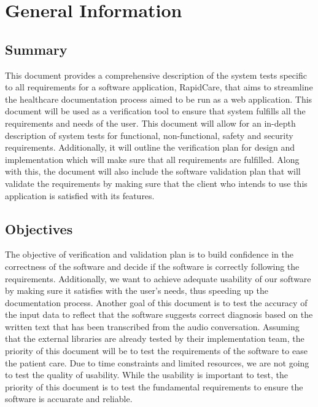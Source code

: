 \documentclass[12pt, titlepage]{article}
\begin{document}

\newpage


\section{General Information}

\subsection{Summary}

This document provides a comprehensive description of the system tests specific to all requirements for a software application, RapidCare, that aims to streamline the healthcare documentation process aimed to be run as a web application. This document will be used as a verification tool to ensure that system fulfills all the requirements and needs of the user. This document will allow for an in-depth description of system tests for functional, non-functional, safety and security requirements. Additionally, it will outline the verification plan for design and implementation which will make sure that all requirements are fulfilled. Along with this, the document will also include the software validation plan that will validate the requirements by making sure that the client who intends to use this application is satisfied with its features.    

\subsection{Objectives}

The objective of verification and validation plan is to build confidence in the correctness of the software and decide if the software is correctly following the requirements. Additionally, we want to achieve adequate usability of our software by making sure it satisfies with the user's needs, thus speeding up the documentation process. Another goal of this document is to test the accuracy of the input data to reflect that the software suggests correct diagnosis based on the written text that has been transcribed from the audio conversation. Assuming that the external libraries are already tested by their implementation team, the priority of this document will be to test the requirements of the software to ease the patient care. Due to time constraints and limited resources, we are not going to test the quality of usability. While the usability is important to test, the priority of this document is to test the fundamental requirements to ensure the software is accuarate and reliable. 
\end{document}
